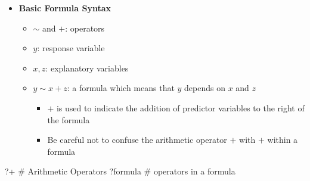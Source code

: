 \documentclass[
  ignorenonframetext,
]{beamer}
\newenvironment{Shaded}{\begin{snugshade}}{\end{snugshade}}
\newcommand{\AttributeTok}[1]{\textcolor[rgb]{0.40,0.45,0.13}{#1}}
\newcommand{\CommentTok}[1]{\textcolor[rgb]{0.37,0.37,0.37}{#1}}
\newcommand{\NormalTok}[1]{\textcolor[rgb]{0.00,0.23,0.31}{#1}}
\newcommand{\StringTok}[1]{\textcolor[rgb]{0.13,0.47,0.30}{#1}}
\providecommand{\tightlist}{%
  \setlength{\itemsep}{0pt}\setlength{\parskip}{0pt}}\usepackage{longtable,booktabs,array}
\begin{document}
\begin{frame}[fragile]{}
\label{section-6}
\begin{itemize}
\item
  \textbf{Basic Formula Syntax}

  \begin{itemize}
  \item
    \(\sim\) and \(+\): operators
  \item
    \(y\): response variable
  \item
    \(x, z\): explanatory variables
  \item
    \(y \sim x + z\): a formula which means that \(y\) depends on \(x\)
    and \(z\)

    \begin{itemize}
    \tightlist
    \item
      \(+\) is used to indicate the addition of predictor variables to
      the right of the formula
    \item
      Be careful not to confuse the arithmetic operator \(+\) with \(+\)
      within a formula
    \end{itemize}
  \end{itemize}
\end{itemize}

\tiny

\begin{Shaded}
\begin{Highlighting}[]
\NormalTok{?}\StringTok{\textasciigrave{}}\AttributeTok{+}\StringTok{\textasciigrave{}} \CommentTok{\# Arithmetic Operators}
\NormalTok{?formula }\CommentTok{\# operators in a formula}
\end{Highlighting}
\end{Shaded}
\end{frame}
\end{document}
